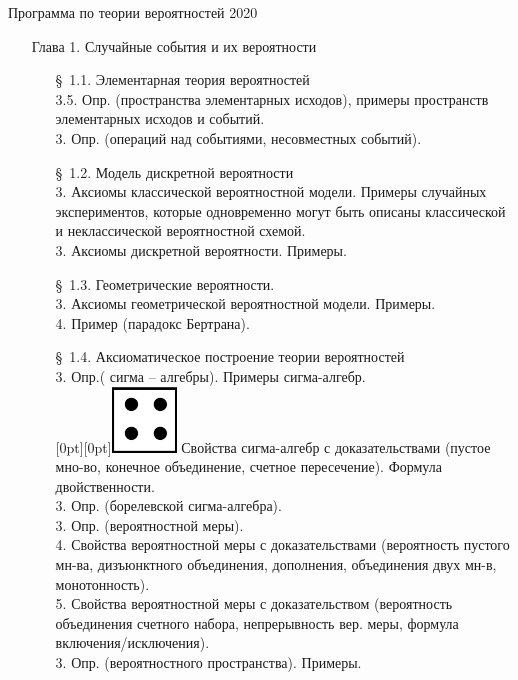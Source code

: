 \documentclass[10pt]{amsart}
\begin{document}
\thispagestyle{empty}

\begin{center}
    {\Large Программа по теории вероятностей 2020}
\end{center}


\begin{enumerate}
\item[Глава 1.] Случайные события и их вероятности \\
\begin{enumerate}
\item[\S\, 1.1.] Элементарная теория вероятностей \\
3.5. Опр. (пространства элементарных исходов), примеры пространств элементарных исходов и событий. \\
3. Опр. (операций над событиями, несовместных событий). \\
\item[\S\, 1.2.] Модель дискретной вероятности \\
3. Аксиомы классической вероятностной модели. Примеры случайных экспериментов, которые одновременно могут быть описаны классической и неклассической вероятностной схемой. \\
3. Аксиомы дискретной вероятности. Примеры. \\
\item[\S\, 1.3.] Геометрические вероятности. \\
3.  Аксиомы геометрической вероятностной модели. Примеры. \\
4. Пример (парадокс Бертрана). \\ 

\item[\S\, 1.4.] Аксиоматическое построение теории вероятностей \\ 
3.  Опр.( сигма – алгебры). Примеры сигма-алгебр. \\
 \raisebox{-1pt}[0pt][0pt]{\includegraphics[width=0.02\linewidth]{4.png}} Свойства сигма-алгебр с доказательствами (пустое мно-во, конечное объединение, счетное пересечение). Формула двойственности. \\
3. Опр. (борелевской сигма-алгебра). \\
3. Опр. (вероятностной меры). \\
4.  Свойства вероятностной меры с доказательствами (вероятность пустого мн-ва, дизъюнктного объединения, дополнения, объединения двух мн-в, монотонность). \\
5. Свойства  вероятностной меры с доказательством (вероятность объединения счетного набора, непрерывность вер. меры, формула включения/исключения). \\
3. Опр. (вероятностного пространства). Примеры. \\


\end{enumerate}
\end{enumerate}
\end{document}
